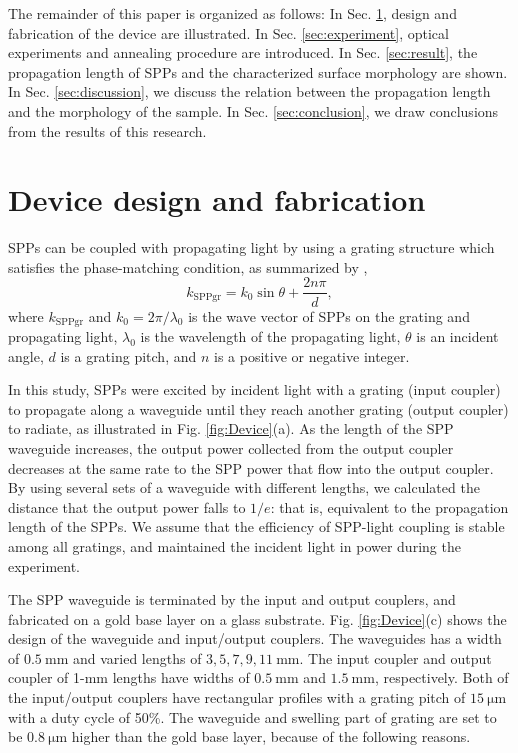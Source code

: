 \documentclass[twocolumn,10.5pt,a4]{article}
\begin{document}
The remainder of this paper is organized as follows: 
In Sec. \ref{sec:device}, design and fabrication of the device are illustrated.
In Sec. \ref{sec:experiment}, optical experiments and annealing procedure are introduced.
In Sec. \ref{sec:result}, the propagation length of SPPs and the characterized surface morphology are shown.
In Sec. \ref{sec:discussion}, we discuss the relation between the propagation length and the morphology of the sample.
In Sec. \ref{sec:conclusion}, we draw conclusions from the results of this research.

\cite{Kusa2014}
\cite{Olmon}
\fi

\section{Device design and fabrication}
\label{sec:device}
SPPs can be coupled with propagating light by using a grating structure which satisfies the phase-matching condition, as summarized by \cite{Koev},
\begin{equation}
k_{\mathrm{SPPgr}}=k_0 \sin \theta + \frac{2n\pi}{d},
\label{eq:phase-match}
\end{equation}
where $k_{\mathrm{SPPgr}}$ and $k_0=2\pi/\lambda_0$ is the wave vector of SPPs on the grating and propagating light, $\lambda_0$ is the wavelength of the propagating light, $\theta$ is an incident angle, $d$ is a grating pitch, and $n$ is a positive or negative integer. 

In this study, SPPs were excited by incident light with a grating (input coupler) to propagate along a waveguide until they reach another grating (output coupler) to radiate, as illustrated in Fig. \ref{fig:Device}(a). As the length of the SPP waveguide increases, the output power collected from the output coupler decreases at the same rate to the SPP power that flow into the output coupler. By using several sets of a waveguide with different lengths, we calculated the distance that the output power falls to $1/e$: that is, equivalent to the propagation length of the SPPs. We assume that the efficiency of SPP-light coupling is stable among all gratings, and maintained the incident light in power during the experiment. 

The SPP waveguide is terminated by the input and output couplers, and fabricated on a gold base layer on a glass substrate.
Fig. \ref{fig:Device}(c) shows the design of the waveguide and input/output couplers. The waveguides has a width of $0.5\:\mathrm{mm}$ and varied lengths of $3,5,7,9,11\:\mathrm{mm}$. The input coupler and output coupler of 1-mm lengths have widths of $0.5\:\mathrm{mm}$ and $1.5\:\mathrm{mm}$, respectively. Both of the input/output couplers have rectangular profiles with a grating pitch of $15\:\mathrm{\mu m}$ with a duty cycle of 50\%. The waveguide and swelling part of grating are set to be $0.8\:\mathrm{\mu m}$ higher than the gold base layer, because of the following reasons.
\end{document}
